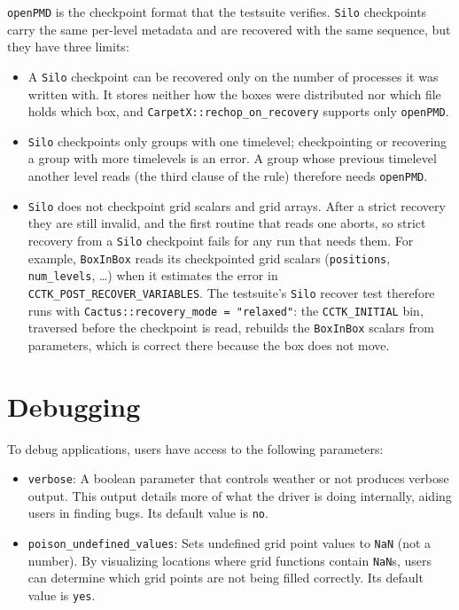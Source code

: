 \texttt{openPMD} is the checkpoint format that the testsuite verifies. \texttt{Silo} checkpoints carry the same per-level metadata and are recovered with the same sequence, but they have three limits:
%
\begin{itemize}
\item A \texttt{Silo} checkpoint can be recovered only on the number of processes it was written with. It stores neither how the boxes were distributed nor which file holds which box, and \texttt{CarpetX::rechop\_on\_recovery} supports only \texttt{openPMD}.
\item \texttt{Silo} checkpoints only groups with one timelevel; checkpointing or recovering a group with more timelevels is an error. A group whose previous timelevel another level reads (the third clause of the rule) therefore needs \texttt{openPMD}.
\item \texttt{Silo} does not checkpoint grid scalars and grid arrays. After a strict recovery they are still invalid, and the first routine that reads one aborts, so strict recovery from a \texttt{Silo} checkpoint fails for any run that needs them. For example, \texttt{BoxInBox} reads its checkpointed grid scalars (\texttt{positions}, \texttt{num\_levels}, \ldots) when it estimates the error in \texttt{CCTK\_POST\_RECOVER\_VARIABLES}. The testsuite's \texttt{Silo} recover test therefore runs with \texttt{Cactus::recovery\_mode = "relaxed"}: the \texttt{CCTK\_INITIAL} bin, traversed before the checkpoint is read, rebuilds the \texttt{BoxInBox} scalars from parameters, which is correct there because the box does not move.
\end{itemize}

\section{Debugging}
\label{sec:debugging}

To debug \CarpetX\space applications, users have access to the following parameters: 
%
\begin{itemize}
    \item \texttt{verbose}: A boolean parameter that controls weather or not \CarpetX\space produces verbose output. This output details more of what the driver is doing internally, aiding users in finding bugs. Its default value is \texttt{no}.

    \item \texttt{poison\_undefined\_values}: Sets undefined grid point values to \texttt{NaN} (not a number). By visualizing locations where grid functions contain \texttt{NaN}s, users can determine which grid points are not being filled correctly. Its default value is \texttt{yes}.
\end{itemize}





